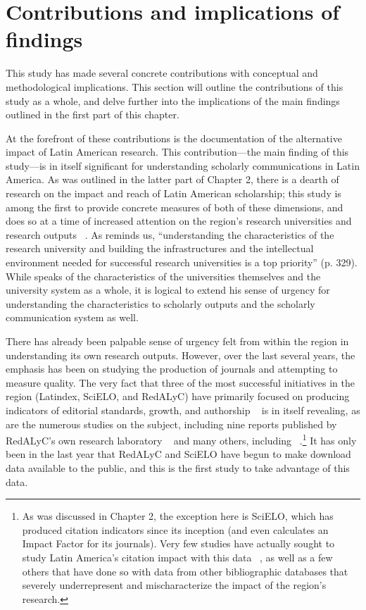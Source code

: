 \section{Contributions and implications of findings}
\label{contributionsandimplicationsoffindings}

This study has made several concrete contributions with conceptual and methodological implications. This section will outline the contributions of this study as a whole, and delve further into the implications of the main findings outlined in the first part of this chapter.

At the forefront of these contributions is the documentation of the alternative impact of Latin American research. This contribution—the main finding of this study—is in itself significant for understanding scholarly communications in Latin America. As was outlined in the latter part of Chapter 2, there is a dearth of research on the impact and reach of Latin American scholarship; this study is among the first to provide concrete measures of both of these dimensions, and does so at a time of increased attention on the region's research universities and research outputs ~\citep{Altbach2007,Bernasconi2007,Altbach2013}. As  \citet{Altbach2013} reminds us, ``understanding the characteristics of the research university and building the infrastructures and the intellectual environment needed for successful research universities is a top priority'' (p. 329). While  \citet{Altbach2013} speaks of the characteristics of the universities themselves and the university system as a whole, it is logical to extend his sense of urgency for understanding the characteristics to scholarly outputs and the scholarly communication system as well.

There has already been palpable sense of urgency felt from within the region in understanding its own research outputs. However, over the last several years, the emphasis has been on studying the production of journals and attempting to measure quality. The very fact that three of the most successful initiatives in the region (Latindex, SciELO, and RedALyC) have primarily focused on producing indicators of editorial standards, growth, and authorship ~\citep{Alperin2014c} is in itself revealing, as are the numerous studies on the subject, including nine reports published by RedALyC's own research laboratory ~\citep{RedALyCFractal} and many others, including ~\citep{Cetto1998,Collazo-Reyes2008,Alonso-Gamboa2012,Russell1998,Russell2009}.\footnote{As was discussed in Chapter 2, the exception here is SciELO, which has produced citation indicators since its inception (and even calculates an Impact Factor for its journals). Very few studies have actually sought to study Latin America's citation impact with this data ~\citep[among a handful of others]{Pereira2006,Pinto2007,Huamani2009,Meneghini2006,Luna-Morales2007,Packer2007}, as well as a few others that have done so with data from other bibliographic databases that severely underrepresent and mischaracterize the impact of the region's research.} It has only been in the last year that RedALyC and SciELO have begun to make download data available to the public, and this is the first study to take advantage of this data.

